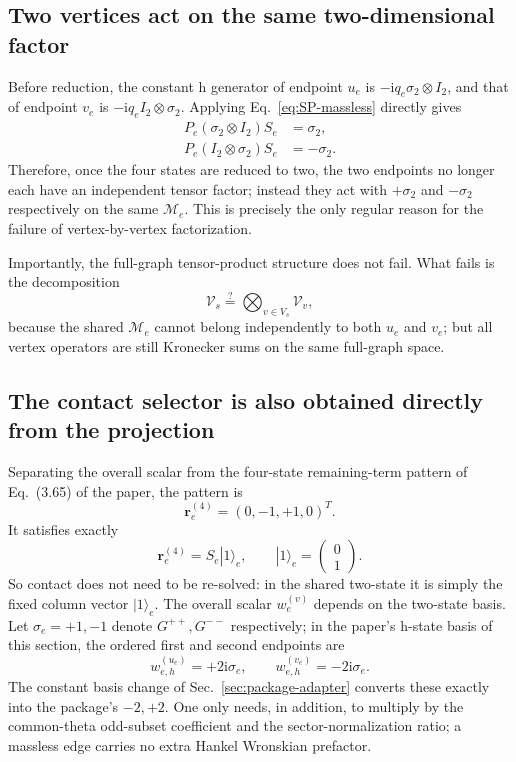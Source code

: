 \documentclass[11pt,a4paper]{article}
\newcommand{\ii}{\mathrm i}
\newcommand{\cV}{\mathcal V}
\newcommand{\cM}{\mathcal M}
\begin{document}
\subsection{Two vertices act on the same two-dimensional factor}

Before reduction, the constant h generator of endpoint $u_e$ is $-\ii q_e\sigma_2\otimes I_2$, and that of endpoint $v_e$ is $-\ii q_eI_2\otimes\sigma_2$. Applying Eq.~\eqref{eq:SP-massless} directly gives
\begin{align}
 P_e(\sigma_2\otimes I_2)S_e&=\sigma_2,
 \label{eq:first-endpoint-projection}\\
 P_e(I_2\otimes\sigma_2)S_e&=-\sigma_2.
 \label{eq:second-endpoint-projection}
\end{align}
Therefore, once the four states are reduced to two, the two endpoints no longer each have an independent tensor factor; instead they act with $+\sigma_2$ and $-\sigma_2$ respectively on the same $\cM_e$. This is precisely the only regular reason for the failure of vertex-by-vertex factorization.

Importantly, the full-graph tensor-product structure does not fail. What fails is the decomposition
\begin{equation}
 \cV_s\stackrel{?}{=}\bigotimes_{v\in V_s}\cV_v,
\end{equation}
because the shared $\cM_e$ cannot belong independently to both $u_e$ and $v_e$; but all vertex operators are still Kronecker sums on the same full-graph space.

\subsection{The contact selector is also obtained directly from the projection}

Separating the overall scalar from the four-state remaining-term pattern of Eq.~(3.65) of the paper, the pattern is
\begin{equation}
 \bm r_e^{(4)}=(0,-1,+1,0)^T.
\end{equation}
It satisfies exactly
\begin{equation}
 \bm r_e^{(4)}=S_e|1\rangle_e,
 \qquad
 |1\rangle_e=\begin{pmatrix}0\\1\end{pmatrix}.
 \label{eq:contact-vector-projection}
\end{equation}
So contact does not need to be re-solved: in the shared two-state it is simply the fixed column vector $|1\rangle_e$. The overall scalar $w_e^{(v)}$ depends on the two-state basis. Let $\sigma_e=+1,-1$ denote $G^{++},G^{--}$ respectively; in the paper's h-state basis of this section, the ordered first and second endpoints are
\begin{equation}
 w_{e,h}^{(u_e)}=+2\ii\sigma_e,
 \qquad
 w_{e,h}^{(v_e)}=-2\ii\sigma_e.
 \label{eq:h-massless-contact-weight}
\end{equation}
The constant basis change of Sec.~\ref{sec:package-adapter} converts these exactly into the package's $-2,+2$. One only needs, in addition, to multiply by the common-theta odd-subset coefficient and the sector-normalization ratio; a massless edge carries no extra Hankel Wronskian prefactor.
\end{document}
